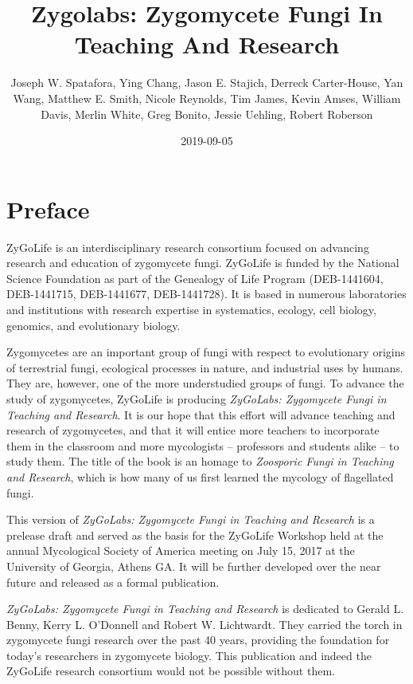 \documentclass[]{book}
\title{Zygolabs: Zygomycete Fungi In Teaching And Research}
\author{Joseph W. Spatafora, Ying Chang, Jason E. Stajich, Derreck Carter-House, Yan Wang, Matthew E. Smith, Nicole Reynolds, Tim James, Kevin Amses, William Davis, Merlin White, Greg Bonito, Jessie Uehling, Robert Roberson}
\date{2019-09-05}
\begin{document}
\maketitle

{
\setcounter{tocdepth}{1}
\tableofcontents
}
\hypertarget{preface}{%
\chapter*{Preface}\label{preface}}

ZyGoLife is an interdisciplinary research consortium focused on advancing research and education of zygomycete fungi. ZyGoLife is funded by the National Science Foundation as part of the Genealogy of Life Program (DEB-1441604, DEB-1441715, DEB-1441677, DEB-1441728). It is based in numerous laboratories and institutions with research expertise in systematics, ecology, cell biology, genomics, and evolutionary biology.

Zygomycetes are an important group of fungi with respect to evolutionary origins of terrestrial fungi, ecological processes in nature, and industrial uses by humans. They are, however, one of the more understudied groups of fungi. To advance the study of zygomycetes, ZyGoLife is producing \emph{ZyGoLabs: Zygomycete Fungi in Teaching and Research}. It is our hope that this effort will advance teaching and research of zygomycetes, and that it will entice more teachers to incorporate them in the classroom and more mycologists -- professors and students alike -- to study them. The title of the book is an homage to \emph{Zoosporic Fungi in Teaching and Research}, which is how many of us first learned the mycology of flagellated fungi.

This version of \emph{ZyGoLabs: Zygomycete Fungi in Teaching and Research} is a prelease draft and served as the basis for the ZyGoLife Workshop held at the annual Mycological Society of America meeting on July 15, 2017 at the University of Georgia, Athens GA. It will be further developed over the near future and released as a formal publication.

\emph{ZyGoLabs: Zygomycete Fungi in Teaching and Research} is dedicated to Gerald L. Benny, Kerry L. O'Donnell and Robert W. Lichtwardt. They carried the torch in zygomycete fungi research over the past 40 years, providing the foundation for today's researchers in zygomycete biology. This publication and indeed the ZyGoLife research consortium would not be possible without them.
\end{document}

